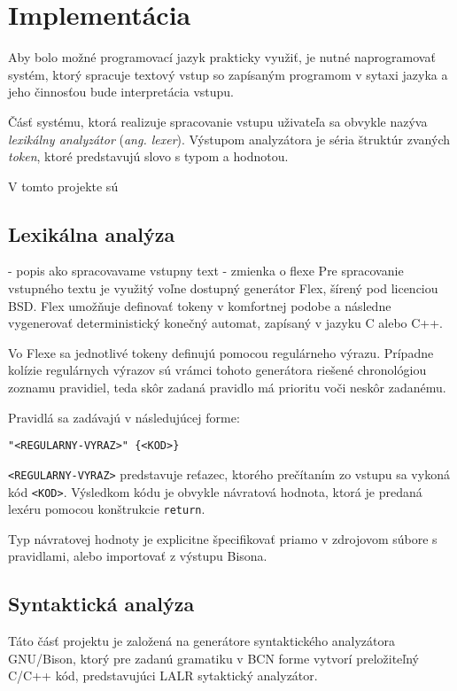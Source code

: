 
\chapter{Implementácia}
Aby bolo možné programovací jazyk prakticky využiť, je nutné naprogramovať systém, ktorý spracuje textový vstup so zapísaným programom v sytaxi
jazyka a jeho činnosťou bude interpretácia vstupu.

Čásť systému, ktorá realizuje spracovanie vstupu uživateľa sa obvykle nazýva \textit{lexikálny analyzátor} (\textit{ang. lexer}). Výstupom analyzátora je
séria štruktúr zvaných \textit{token}, ktoré predstavujú slovo s typom a hodnotou. 

V tomto projekte sú 

\section{Lexikálna analýza}
		- popis ako spracovavame vstupny text
		- zmienka o flexe	
Pre spracovanie vstupného textu je využitý voľne dostupný generátor Flex, šírený pod licenciou BSD. Flex umožňuje definovať tokeny
v komfortnej podobe a následne vygenerovať deterministický konečný automat, zapísaný v jazyku C alebo C++.

Vo Flexe sa jednotlivé tokeny definujú pomocou regulárneho výrazu. Prípadne kolízie regulárnych výrazov sú vrámci tohoto generátora
riešené chronológiou zoznamu pravidiel, teda skôr zadaná pravidlo má prioritu voči neskôr zadanému.

Pravidlá sa zadávajú v následujúcej forme:
\begin{verbatim}
"<REGULARNY-VYRAZ>" {<KOD>}
\end{verbatim}

\texttt{<REGULARNY-VYRAZ>} predstavuje reťazec, ktorého prečítaním zo vstupu sa vykoná kód \texttt{<KOD>}.
Výsledkom kódu je obvykle návratová hodnota, ktorá je predaná lexéru pomocou konštrukcie \texttt{return}.

Typ návratovej hodnoty je explicitne špecifikovať priamo v zdrojovom súbore s pravidlami, alebo importovať z výstupu Bisona.

\section{Syntaktická analýza}
Táto čásť projektu je založená na generátore syntaktického analyzátora GNU/Bison, ktorý pre zadanú gramatiku v BCN forme vytvorí preložiteľný
C/C++ kód, predstavujúci LALR sytaktický analyzátor.

